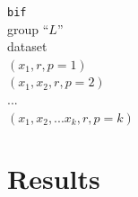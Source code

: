 \documentclass[12pt]{article}
\begin{document}
\begin{tabbing}
\texttt{bif}\\
  \hspace{5mm} group ``$L$'' \\
  \hspace{10mm} dataset \\
  \hspace{15mm} $ (x_{1}, r, p=1)$ \\
  \hspace{15mm} $ (x_{1},x_2, r, p=2)$ \\
  \hspace{15mm} ... \\
  \hspace{15mm} $ (x_{1},x_2,...x_k, r, p=k)$ \\
\end{tabbing}

\section{Results}
\end{document}
